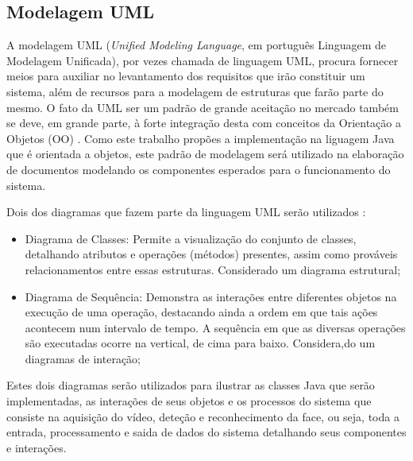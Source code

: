\subsection{Modelagem UML}\label{subsec:uml}

A modelagem UML (\textit{Unified Modeling Language}, em português Linguagem de Modelagem Unificada), por vezes chamada de linguagem UML, procura fornecer meios para auxiliar no levantamento dos requisitos que irão constituir um sistema, além de recursos para a modelagem de estruturas que farão parte do mesmo. O fato da UML ser um padrão de grande aceitação no mercado também se deve, em grande parte, à forte integração desta com conceitos da Orientação a Objetos (OO) \cite{uml}. Como este trabalho propões a implementação na liguagem Java que é orientada a objetos, este padrão de modelagem será utilizado na elaboração de documentos modelando os componentes esperados para o funcionamento do sistema.

Dois dos diagramas que fazem parte da linguagem UML serão utilizados \cite{uml}:

\begin{itemize}
	\item Diagrama de Classes: Permite a visualização do conjunto de classes, detalhando atributos e operações (métodos) presentes, assim como prováveis relacionamentos entre essas estruturas. Considerado um diagrama estrutural;
	
	\item Diagrama de Sequência: Demonstra as interações entre diferentes objetos na execução de uma operação, destacando ainda a ordem em que tais ações acontecem num intervalo de tempo. A sequência em que as diversas operações são executadas ocorre na vertical, de cima para baixo. Considera,do um diagramas de interação;	
\end{itemize}

Estes dois diagramas serão utilizados para ilustrar as classes Java que serão implementadas, as interações de seus objetos e os processos do sistema que consiste na aquisição do vídeo, deteção e reconhecimento da face, ou seja, toda a entrada, processamento e saida de dados do sistema detalhando seus componentes e interações.

